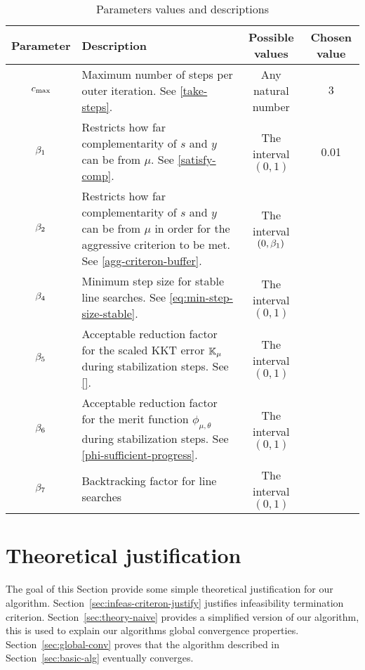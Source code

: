 \documentclass{article}
\begin{document}
\begin{table}[H]
\begin{tabular}{ |c| p{7cm}|c|c| } 
 \hline
Parameter & Description & Possible values & Chosen value  \\ 
 \hline
$c_{\max}$ & Maximum number of steps per outer iteration. See \eqref{take-steps}.  & Any natural number & $3$  \\ 
 \hline
  $\beta_{1}$ & Restricts how far complementarity of $s$ and $y$ can be from $\mu$. See \eqref{satisfy-comp}.  & The interval $(0,1)$ & 0.01 \\ 
 \hline
   $\beta_{2}$ & Restricts how far complementarity of $s$ and $y$ can be from $\mu$ in order for the aggressive criterion to be met. See \eqref{agg-criteron-buffer}.  & The interval  $(0, \beta_{1})$ &  \\ 
    \hline
   $\beta_{4}$ & Minimum step size for stable line searches. See \eqref{eq:min-step-size-stable}.  & The interval $(0,1)$ &  \\ 
   \hline
      $\beta_{5}$ & Acceptable reduction factor for the scaled KKT error $\mathbb{K}_{\mu}$ during stabilization steps. See \eqref{}.  & The interval $(0,1)$ &  \\ 
      \hline
            $\beta_{6}$ & Acceptable reduction factor for the merit function $\phi_{\mu,\theta}$ during stabilization steps. See \eqref{phi-sufficient-progress}.  & The interval $(0,1)$ &  \\
        \hline
$\beta_{7}$ & Backtracking factor for line searches & The interval $(0,1)$ & \\
\hline
\end{tabular}
\caption{Parameters values and descriptions}
\end{table}


\section{Theoretical justification}\label{sec:theory}

The goal of this Section provide some simple theoretical justification for our algorithm. Section~\ref{sec:infeas-criteron-justify} justifies infeasibility termination criterion. Section~\ref{sec:theory-naive} provides a simplified version of our algorithm, this is used to explain our algorithms global convergence properties. Section~\ref{sec:global-conv} proves that the algorithm described in Section~\ref{sec:basic-alg} eventually converges. 
\end{document}
